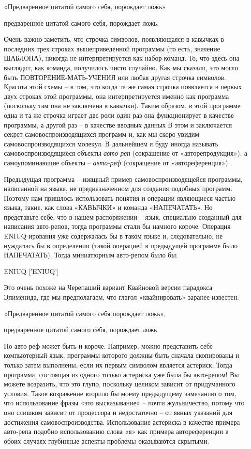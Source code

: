 \documentclass[../main.tex]{subfiles}
\begin{document}
«Предваренное цитатой самого себя, порождает ложь»

предваренное цитатой самого себя, порождает ложь.

Очень важно заметить, что строчка символов, появляющаяся в кавычках в последних трех строках вышеприведенной программы (то есть, значение ШАБЛОНА), никогда не интерпретируется как набор команд. То, что здесь она выглядит, как команда, получилось чисто случайно. Как мы сказали, это могло быть ПОВТОРЕНИЕ-МАТЬ-УЧЕНИЯ или любая другая строчка символов. Красота этой схемы \--- в том, что когда та же самая строчка появляется в первых двух строках этой программы, она интерпретируется именно как программа (поскольку там она не заключена в кавычки). Таким образом, в этой программе одна и та же строчка играет две роли один раз она функционирует в качестве программы, а другой раз \--- в качестве вводных данных В этом и заключается секрет самовоспроизводящихся программ и, как мы скоро увидим самовоспроизводящихся молекул. В дальнейшем я буду иногда называть самовоспроизводящиеся объекты \emph{авто-реп} (сокращение от «авторепродукция»), а самоупоминающие объекты \--- \emph{авто-реф} (сокращение от «автореференция»).

Предыдущая программа \--- изящный пример самовоспроизводящейся программы, написанной на языке, не предназначенном для создания подобных программ. Поэтому нам пришлось использовать понятия и операции являющиеся частью языка, такие, как слова «КАВЫЧКИ» и команда «НАПЕЧАТАТЬ». Но представьте себе, что в нашем распоряжении \--- язык, специально созданный для написания авто-репов, тогда программы стали бы намного короче. Операция ENIUQ-ирования уже содержалась бы в таком языке и, следовательно, не нуждалась бы в определении (такой операцией в предыдущей программе было НАПЕЧАТАТЬ). Тогда миниатюрным авто-репом было бы:

ENIUQ {[}'ENIUQ'{]}

Это очень похоже на Черепаший вариант Квайновой версии парадокса Эпименида, где мы предполагаем, что глагол «квайнировать» заранее известен:

«Предваренное цитатой самого себя порождает ложь»,

предваренное цитатой самого себя, порождает ложь.

Но авто-реф может быть и короче. Например, можно представить себе компьютерный язык, программы которого должны быть сначала скопированы и только затем выполнены, если их первым символом является астериск. Тогда программа, состоящая из одного только астериска уже была бы авто-репом! Вы можете возразить, что это глупо, поскольку целиком зависит от придуманного условия. Такое возражение вторило бы моему предыдущему замечанию о том, что использование фразы «это высказывание» \--- почти жульничество, потому что оно слишком зависит от процессора и недостаточно \--- от явных указаний для достижения самовоспроизводства. Использование астериска в качестве примера авто-репа подобно использованию слова «я» как примера автореференции в обоих случаях глубинные аспекты проблемы оказываются скрытыми.
\end{document}
